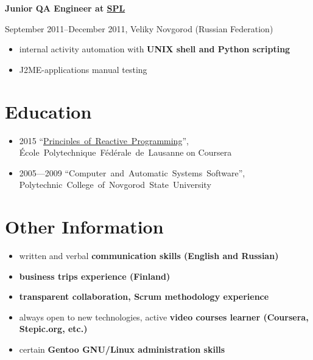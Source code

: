 \vspace{0.5cm}

{
\fontsize{12pt}{12pt}\selectfont
\bfseries Junior QA Engineer at
\href{http://spl.co}{\bfseries SPL\mdseries}
\mdseries
}

{
\fontsize{9pt}{8pt}\selectfont
September 2011--December 2011, Veliky Novgorod (Russian Federation)
}

\begin{itemize}[rightmargin=\dimexpr\linewidth-17cm-\leftmargin\relax]
    \setlength{\itemindent}{20pt}
    \item internal activity automation with \bfseries UNIX shell \mdseries and \bfseries Python \mdseries scripting
    \item J2ME-applications manual testing
\end{itemize}

\section*{Education}
\begin{itemize}
    \item 2015 ``\href{https://www.coursera.org/account/accomplishments/verify/UJJ99REEZY}{Principles~of~Reactive~Programming}'', École~Polytechnique~Fédérale~de~Lausanne on Coursera
    \item 2005---2009 ``Computer~and~Automatic~Systems~Software'', Polytechnic~College~of~Novgorod~State~University
\end{itemize}

\section*{Other Information}
\begin{itemize}
    \item written and verbal \bfseries communication skills \mdseries (English and Russian)
    \item \bfseries business trips \mdseries experience (Finland)
    \item \bfseries transparent \mdseries collaboration, \bfseries Scrum \mdseries methodology experience
    \item always open to new technologies, active \bfseries video courses \mdseries learner (Coursera, Stepic.org, etc.)
    \item certain \bfseries Gentoo \mdseries GNU/Linux administration skills
\end{itemize}


